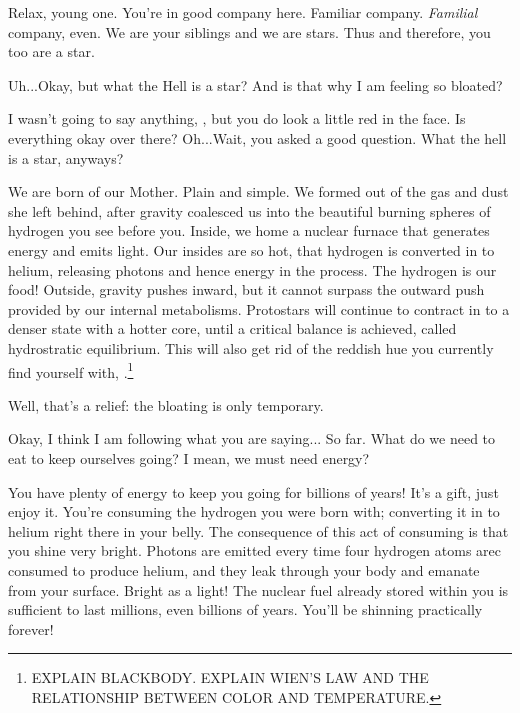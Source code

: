 \documentclass[main.tex]{subfiles}
\begin{document}
\par \Maia Relax, young one.  You're in good company here.  Familiar company.  \textit{Familial} company, even. We are your siblings and we are stars.  Thus and therefore, you too are a star.  

\par \Sterope Uh...Okay, but what the Hell is a star?  And is that why I am feeling so bloated?

\par \Alcyone I wasn't going to say anything, \rmsterope, but you do look a little red in the face.  Is everything okay over there?  Oh...Wait, you asked a good question.  What the hell is a star, anyways?

\par \Maia We are born of our Mother.  Plain and simple.  We formed out of the gas and dust she left behind, after gravity coalesced us into the beautiful burning spheres of hydrogen you see before you.  Inside, we home a nuclear furnace that generates energy and emits light.  Our insides are so hot, that hydrogen is converted in to helium, releasing photons and hence energy in the process.  The hydrogen is our food!  Outside, gravity pushes inward, but it cannot surpass the outward push provided by our internal metabolisms.  Protostars will continue to contract in to a denser state with a hotter core, until a critical balance is achieved, called hydrostratic equilibrium.  This will also get rid of the reddish hue you currently find yourself with, \rmsterope.\footnote{EXPLAIN BLACKBODY.  EXPLAIN WIEN'S LAW AND THE RELATIONSHIP BETWEEN COLOR AND TEMPERATURE.}

\par \Sterope Well, that's a relief: the bloating is only temporary.

\par \Alcyone Okay, I think I am following what you are saying... So far.  What do we need to eat to keep ourselves going?  I mean, we must need energy?

\par \Maia You have plenty of energy to keep you going for billions of years!  It's a gift, just enjoy it.  You're consuming the hydrogen you were born with; converting it in to helium right there in your belly.  The consequence of this act of consuming is that you shine very bright.  Photons are emitted every time four hydrogen atoms arec consumed to produce helium, and they leak through your body and emanate from your surface.  Bright as a light!  The nuclear fuel already stored within you is sufficient to last millions, even billions of years.  You'll be shinning practically forever!
\end{document}
